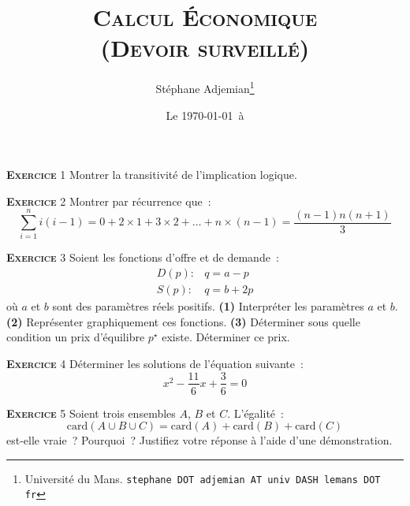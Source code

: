 \documentclass[10pt,a4paper,notitlepage]{article}
\newcommand{\exercice}[1]{\textsc{\textbf{Exercice}} #1}
\begin{document}
\title{\textsc{Calcul Économique\\ \small{(Devoir surveillé)}}}
\author{Stéphane Adjemian\thanks{Université du Mans. \texttt{stephane DOT adjemian AT univ DASH lemans DOT fr}}}
\date{Le \today\ à \thistime}

\maketitle


\exercice{1} Montrer la transitivité de l'implication logique.

\bigskip

\exercice{2} Montrer par récurrence que~:
\[
  \sum_{i=1}^n  i(i-1) = 0 + 2\times 1 + 3\times 2 + \dots + n\times(n-1) = \frac{(n-1)n(n+1)}{3}
\]

\bigskip

\exercice{3} Soient les fonctions d'offre et de demande~:
\[
\begin{split}
  D(p):& q = a - p\\
  S(p):& q = b + 2p
\end{split}
\] 
où $a$ et $b$ sont des paramètres réels positifs. \textbf{(1)} Interpréter les
paramètres $a$ et $b$. \textbf{(2)} Représenter graphiquement ces
fonctions. \textbf{(3)} Déterminer sous quelle condition un prix d'équilibre
$p^{\star}$ existe. Déterminer ce prix.

\bigskip

\exercice{4} Déterminer les solutions de l'équation suivante~:
\[
x^2 - \frac{11}{6}x + \frac{3}{6} = 0
\]

\bigskip

\exercice{5} Soient trois ensembles $A$, $B$ et $C$. L'égalité~:
\[
  \mathrm{card}(A \cup B \cup C) = \mathrm{card}(A) + \mathrm{card}(B) + \mathrm{card}(C)
\]
est-elle vraie~? Pourquoi~? Justifiez votre réponse à l'aide d'une démonstration.
\end{document}
